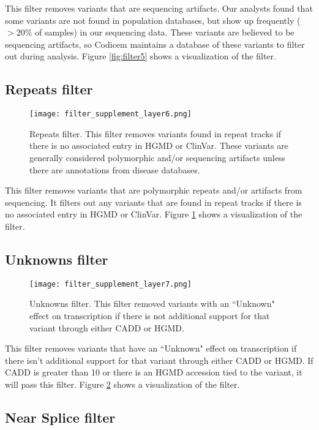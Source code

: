 \documentclass{article}
\begin{document}
This filter removes variants that are sequencing artifacts.  Our analysts found that some variants are not found in population databases, but show up frequently ($>20$\% of samples) in our sequencing data.  These variants are believed to be sequencing artifacts, so Codicem maintains a database of these variants to filter out during analysis.  Figure \ref{fig:filter5} shows a visualization of the filter.

\subsection{Repeats filter}

\begin{figure}
\centering
\texttt{[image: filter\_supplement\_layer6.png]}
\caption{Repeats filter.  This filter removes variants found in repeat tracks if there is no associated entry in HGMD or ClinVar.  These variants are generally considered polymorphic and/or sequencing artifacts unless there are annotations from disease databases.}
\label{fig:filter6}
\end{figure}

This filter removes variants that are polymorphic repeats and/or artifacts from sequencing.  It filters out any variants that are found in repeat tracks if there is no associated entry in HGMD or ClinVar.  Figure \ref{fig:filter6} shows a visualization of the filter.

\subsection{Unknowns filter}

\begin{figure}
\centering
\texttt{[image: filter\_supplement\_layer7.png]}
\caption{Unknowns filter.  This filter removed variants with an ``Unknown" effect on transcription if there is not additional support for that variant through either CADD or HGMD.}
\label{fig:filter7}
\end{figure}

This filter removes variants that have an ``Unknown" effect on transcription if there isn't additional support for that variant through either CADD or HGMD.  If CADD is greater than 10 or there is an HGMD accession tied to the variant, it will pass this filter.  Figure \ref{fig:filter7} shows a visualization of the filter.

\subsection{Near Splice filter}
\end{document}
